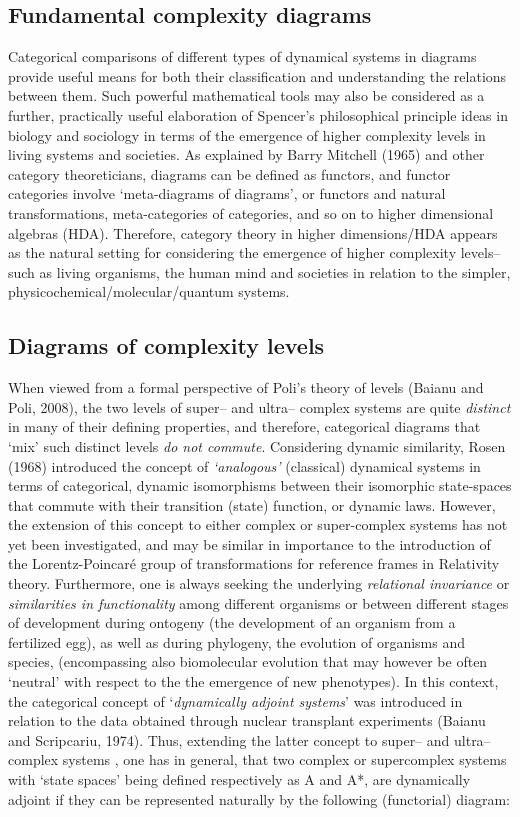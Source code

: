 \documentclass[12pt]{article}
\theoremstyle{plain}
\theoremstyle{definition}
\theoremstyle{plain}
\numberwithin{equation}{section}
\begin{document}
\subsection{Fundamental complexity diagrams} 

 Categorical comparisons of different types of dynamical systems in diagrams provide useful means for both their classification and understanding the relations between them. Such powerful mathematical tools may also be considered as a further, practically useful elaboration of Spencer's philosophical principle ideas in biology and sociology in terms of the emergence of higher complexity levels in living systems and societies. 
As explained by Barry Mitchell (1965) and other category theoreticians, diagrams can be defined as functors, and functor categories involve `meta-diagrams of diagrams', or functors and natural transformations, meta-categories of categories, and so on to higher dimensional algebras (HDA). Therefore, category theory in higher dimensions/HDA
appears as the natural setting for considering the emergence of higher complexity levels--such as living organisms,
the human mind and societies in relation to the simpler, physicochemical/molecular/quantum systems. 

\subsection{Diagrams of complexity levels}

 When viewed from a formal perspective of Poli's theory of levels (Baianu and Poli, 2008), the two levels of super-- and ultra-- complex systems are quite \emph{distinct} in many of their defining properties, and therefore, categorical diagrams that `mix' such distinct levels \emph{do not commute}. 
Considering dynamic similarity, Rosen (1968) introduced the concept of \emph{`analogous'} (classical) dynamical systems in terms of categorical, dynamic isomorphisms between their isomorphic state-spaces that commute with their transition (state) function, or dynamic laws.  However, the extension of this concept to either complex or super-complex systems has not yet been investigated, and may be similar in importance to the introduction of the Lorentz-Poincar\'e group of transformations for reference frames in Relativity theory. Furthermore, one
is always seeking the underlying \emph{relational invariance} or \emph{similarities in functionality} among different organisms or between different stages of development during ontogeny (the development of an organism from a fertilized egg), as well as during phylogeny, the evolution of organisms and species, (encompassing also biomolecular evolution
that may however be often `neutral' with respect to the the emergence of new phenotypes). In this context,
the categorical concept of `\emph{dynamically adjoint systems}' was introduced in relation to the data obtained through nuclear transplant experiments (Baianu and Scripcariu, 1974). Thus, extending the latter concept to super-- and ultra-- complex systems , one has in  general, that two complex or supercomplex systems with `state spaces' being defined respectively as A and A*, are dynamically adjoint if they can be represented naturally by the following (functorial) diagram:
\end{document}
